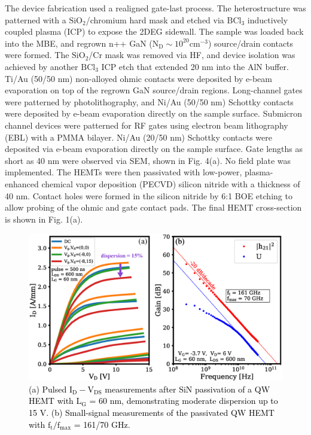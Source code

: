 \documentclass[journal]{IEEEtran}
\begin{document}
The device fabrication used a realigned gate-last process. The heterostructure was patterned with a $\mathrm{SiO_2}$/chromium hard mask and etched via $\mathrm{BCl_3}$ inductively coupled plasma (ICP) to expose the 2DEG sidewall. The sample was loaded back into the MBE, and regrown n++ GaN ($\mathrm{N_D}\sim10^{20} \mathrm{cm^{-3}}$) source/drain contacts were formed. The $\mathrm{SiO_2}$/Cr mask was removed via HF, and device isolation was achieved by another $\mathrm{BCl_3}$ ICP etch that extended 20 nm into the AlN buffer. Ti/Au (50/50 nm) non-alloyed ohmic contacts were deposited by e-beam evaporation on top of the regrown GaN source/drain regions. Long-channel gates were patterned by photolithography, and Ni/Au (50/50 nm) Schottky contacts were deposited by e-beam evaporation directly on the sample surface. Submicron channel devices were patterned for RF gates using electron beam lithography (EBL) with a PMMA bilayer. Ni/Au (20/50 nm) Schottky contacts were deposited via e-beam evaporation directly on the sample surface. Gate lengths as short as 40 nm were observed via SEM, shown in Fig. 4(a). No field plate was implemented. The HEMTs were then passivated with low-power, plasma-enhanced chemical vapor deposition (PECVD) silicon nitride with a thickness of 40 nm. Contact holes were formed in the silicon nitride by 6:1 BOE etching to allow probing of the ohmic and gate contact pads. The final HEMT cross-section is shown in Fig. 1(a).

\begin{figure}[!b]
\centering
\includegraphics[width=\columnwidth]{Figure3_withsmallsignal.eps}
\caption{\textcolor{black}{(a) Pulsed $\mathrm{I_D-V_{DS}}$ measurements after SiN passivation of a QW HEMT with $\mathrm{L_G}$ = 60 nm, demonstrating moderate dispersion up to 15 V. (b) Small-signal measurements of the passivated QW HEMT with $\mathrm{f_t/f_{max}}$ = 161/70 GHz.}}
\label{fig:pulsed}
\end{figure}
\end{document}
